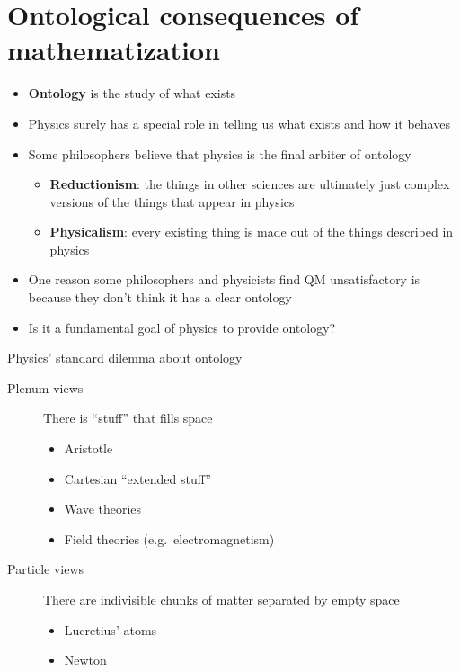 \documentclass[fleqn]{beamer}
\newcommand{\kw}[1]{\textbf{#1}}
\begin{document}
\section{Ontological consequences of mathematization}

\begin{frame}

  \begin{itemize}
  \item \kw{Ontology} is the study of what exists
  \item Physics surely has a special role in telling us what exists
    and how it behaves
  \item Some philosophers believe that physics is the final arbiter of
    ontology
    \begin{itemize}
    \item \kw{Reductionism}: the things in other sciences are
      ultimately just complex versions of the things that appear in
      physics
    \item \kw{Physicalism}: every existing thing is made out of the
      things described in physics
    \end{itemize}
  \end{itemize}

\end{frame}

\begin{frame}

  \begin{itemize}
  \item One reason some philosophers and physicists find QM
    unsatisfactory is because they don't think it has a clear ontology
  \item Is it a fundamental goal of physics to provide ontology?
  \end{itemize}

\end{frame}

\begin{frame}{Physics' standard dilemma about ontology}

  \begin{description}
  \item[Plenum views] There is ``stuff'' that fills space
    \begin{itemize}
    \item Aristotle
    \item Cartesian ``extended stuff''
    \item Wave theories
    \item Field theories (e.g.\ electromagnetism)
    \end{itemize}
  \item[Particle views] There are indivisible chunks of matter
    separated by empty space
    \begin{itemize}
    \item Lucretius' atoms
    \item Newton
    \end{itemize}
  \end{description}

\end{frame}
\end{document}
